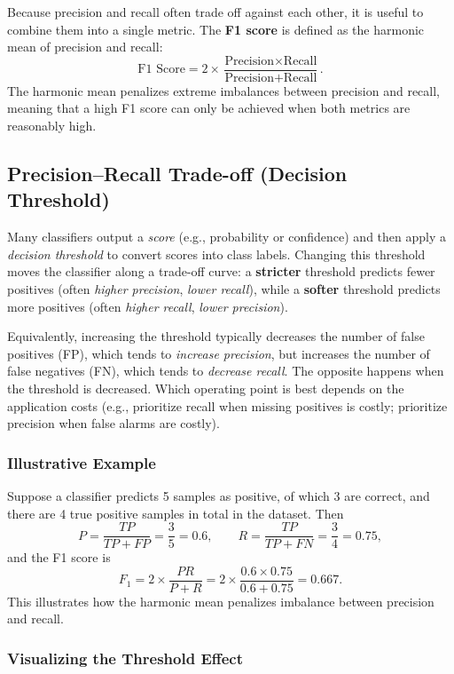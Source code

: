 \documentclass{article}
\begin{document}
Because precision and recall often trade off against each other, it is useful to combine them into a single metric. The \textbf{F1 score} is defined as the harmonic mean of precision and recall:
\[
\text{F1 Score} = 2 \times \frac{\text{Precision} \times \text{Recall}}{\text{Precision} + \text{Recall}}.
\]
The harmonic mean penalizes extreme imbalances between precision and recall, meaning that a high F1 score can only be achieved when both metrics are reasonably high.


\subsection{Precision--Recall Trade-off (Decision Threshold)}

Many classifiers output a \emph{score} (e.g., probability or confidence) and then apply a \emph{decision threshold} to convert scores into class labels.
Changing this threshold moves the classifier along a trade-off curve:
a \textbf{stricter} threshold predicts fewer positives (often \emph{higher precision}, \emph{lower recall}),
while a \textbf{softer} threshold predicts more positives (often \emph{higher recall}, \emph{lower precision}).

Equivalently, increasing the threshold typically decreases the number of false positives (FP), which tends to \emph{increase precision},
but increases the number of false negatives (FN), which tends to \emph{decrease recall}. The opposite happens when the threshold is decreased.
Which operating point is best depends on the application costs (e.g., prioritize recall when missing positives is costly; prioritize precision when false alarms are costly).

\subsubsection{Illustrative Example}
Suppose a classifier predicts 5 samples as positive, of which 3 are correct, and there are 4 true positive samples in total in the dataset. Then
\[
P = \frac{TP}{TP+FP} = \frac{3}{5} = 0.6, 
\qquad
R = \frac{TP}{TP+FN} = \frac{3}{4} = 0.75,
\]
and the F1 score is
\[
F_1 = 2 \times \frac{PR}{P+R}
= 2 \times \frac{0.6 \times 0.75}{0.6 + 0.75}
= 0.667.
\]
This illustrates how the harmonic mean penalizes imbalance between precision and recall.

\subsubsection{Visualizing the Threshold Effect}
\end{document}
